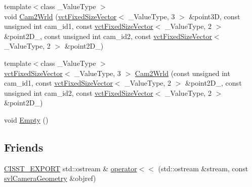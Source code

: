 \begin{DoxyCompactItemize}
{\footnotesize template$<$class \-\_\-\-Value\-Type $>$ }\\void \hyperlink{classsvl_camera_geometry_a2eec87d3959be06311e5c848f8d85dbf}{Cam2\-Wrld} (\hyperlink{classvct_fixed_size_vector}{vct\-Fixed\-Size\-Vector}$<$ \-\_\-\-Value\-Type, 3 $>$ \&point3\-D, const unsigned int cam\-\_\-id1, const \hyperlink{classvct_fixed_size_vector}{vct\-Fixed\-Size\-Vector}$<$ \-\_\-\-Value\-Type, 2 $>$ \&point2\-D\-\_, const unsigned int cam\-\_\-id2, const \hyperlink{classvct_fixed_size_vector}{vct\-Fixed\-Size\-Vector}$<$ \-\_\-\-Value\-Type, 2 $>$ \&point2\-D\-\_)
\item 
{\footnotesize template$<$class \-\_\-\-Value\-Type $>$ }\\\hyperlink{classvct_fixed_size_vector}{vct\-Fixed\-Size\-Vector}$<$ \-\_\-\-Value\-Type, 3 $>$ \hyperlink{classsvl_camera_geometry_a84e42ca7784659fa09382a5647563579}{Cam2\-Wrld} (const unsigned int cam\-\_\-id1, const \hyperlink{classvct_fixed_size_vector}{vct\-Fixed\-Size\-Vector}$<$ \-\_\-\-Value\-Type, 2 $>$ \&point2\-D\-\_, const unsigned int cam\-\_\-id2, const \hyperlink{classvct_fixed_size_vector}{vct\-Fixed\-Size\-Vector}$<$ \-\_\-\-Value\-Type, 2 $>$ \&point2\-D\-\_)
\item 
void \hyperlink{classsvl_camera_geometry_a28bcb4449a2b14f6fa821502c56070a0}{Empty} ()
\end{DoxyCompactItemize}
\subsection*{Friends}
\begin{DoxyCompactItemize}
\item 
\hyperlink{cmn_export_macros_8h_a99393e0c3ac434b2605235bbe20684f8}{C\-I\-S\-S\-T\-\_\-\-E\-X\-P\-O\-R\-T} std\-::ostream \& \hyperlink{classsvl_camera_geometry_a5edcdda0f06ca9f721b13e7e75704fec}{operator$<$$<$} (std\-::ostream \&stream, const \hyperlink{classsvl_camera_geometry}{svl\-Camera\-Geometry} \&objref)
\end{DoxyCompactItemize}


